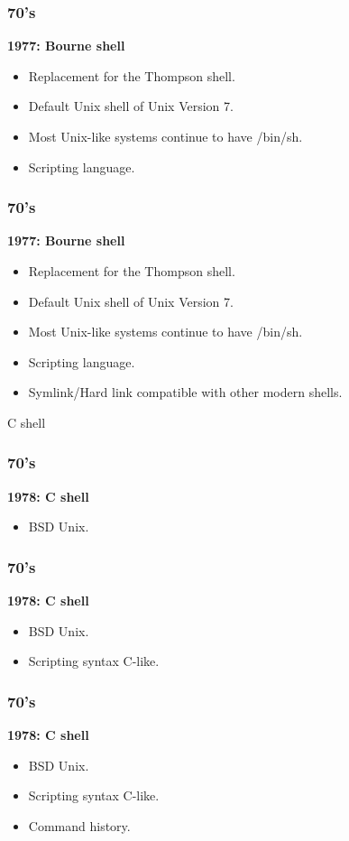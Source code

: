 \documentclass[aspectratio=169]{beamer}
\begin{document}
\begin{frame}
	\frametitle{ 70's}
	\textbf{1977: Bourne shell}
	\begin{itemize}
		\item Replacement for the Thompson shell.
		\item Default Unix shell of Unix Version 7. 
		\item Most Unix-like systems continue to have /bin/sh.
		\item Scripting language.
	\end{itemize}
\end{frame}

\begin{frame}
	\frametitle{ 70's}
	\textbf{1977: Bourne shell}
	\begin{itemize}
		\item Replacement for the Thompson shell.
		\item Default Unix shell of Unix Version 7. 
		\item Most Unix-like systems continue to have /bin/sh.
		\item Scripting language.
		\item Symlink/Hard link compatible with other modern shells.
	\end{itemize}
\end{frame}


\begin{frame}
    \Huge{\centerline{C shell}}
\end{frame}

\begin{frame}
	\frametitle{ 70's}
	\textbf{1978: C shell}
	\begin{itemize}
		\item BSD Unix.
	\end{itemize}
\end{frame}

\begin{frame}
	\frametitle{ 70's}
	\textbf{1978: C shell}
	\begin{itemize}
		\item BSD Unix.
		\item Scripting syntax C-like.
	\end{itemize}
\end{frame}

\begin{frame}
	\frametitle{ 70's}
	\textbf{1978: C shell}
	\begin{itemize}
		\item BSD Unix.
		\item Scripting syntax C-like. 
		\item Command history.
	\end{itemize}
\end{frame}
\end{document}
